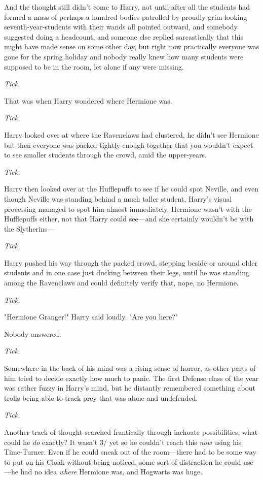 And the thought still didn't come to Harry, not until after all the students
had formed a mass of perhaps a hundred bodies patrolled by proudly grim-looking
seventh-year-students with their wands all pointed outward, and somebody
suggested doing a headcount, and someone else replied sarcastically that this
might have made sense on some other day, but right now practically everyone was
gone for the spring holiday and nobody really knew how many students were
supposed to be in the room, let alone if any were missing.

\emph{Tick.}

That was when Harry wondered where Hermione was.

\emph{Tick.}

Harry looked over at where the Ravenclaws had clustered, he didn't see Hermione
but then everyone was packed tightly-enough together that you wouldn't expect
to see smaller students through the crowd, amid the upper-years.

\emph{Tick.}

Harry then looked over at the Hufflepuffs to see if he could spot Neville, and
even though Neville was standing behind a much taller student, Harry's visual
processing managed to spot him almost immediately. Hermione wasn't with the
Hufflepuffs either, not that Harry could see---and she certainly wouldn't be
with the Slytherins---

\emph{Tick.}

Harry pushed his way through the packed crowd, stepping beside or around older
students and in one case just ducking between their legs, until he was standing
among the Ravenclaws and could definitely verify that, nope, no Hermione.

\emph{Tick.}

"Hermione Granger!" Harry said loudly. "Are you here?"

Nobody answered.

\emph{Tick.}

Somewhere in the back of his mind was a rising sense of horror, as other parts
of him tried to decide exactly how much to panic. The first Defense class of
the year was rather fuzzy in Harry's mind, but he distantly remembered
something about trolls being able to track prey that was alone and undefended.

\emph{Tick.}

Another track of thought searched frantically through inchoate possibilities,
what could he \emph{do} exactly? It wasn't 3\PM/ yet so he couldn't reach this
\emph{now} using his Time-Turner. Even if he could sneak out of the
room---there had to be some way to put on his Cloak without being noticed, some
sort of distraction he could use---he had no idea \emph{where} Hermione was,
and Hogwarts was huge.

